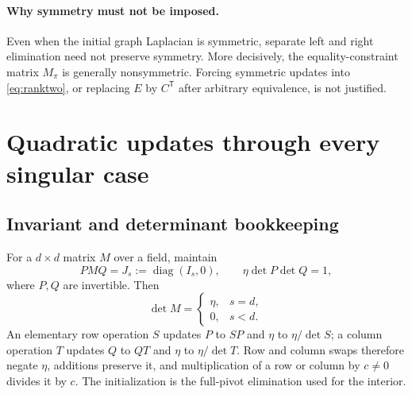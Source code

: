 \documentclass[11pt,letterpaper]{article}
\theoremstyle{definition}\newtheorem{definition}[theorem]{Definition}
\theoremstyle{remark}\newtheorem{remark}[theorem]{Remark}
\newcommand{\diag}{\operatorname{diag}}
\newcommand{\trans}{^{\mathsf T}}
\begin{document}
\paragraph{Why symmetry must not be imposed.}
Even when the initial graph Laplacian is symmetric, separate left and right elimination need not preserve symmetry. More decisively, the equality-constraint matrix $M_\pi$ is generally nonsymmetric. Forcing symmetric updates into \eqref{eq:ranktwo}, or replacing $E$ by $C\trans$ after arbitrary equivalence, is not justified.

\section{Quadratic updates through every singular case}
\label{sec:rank}

\subsection{Invariant and determinant bookkeeping}
For a $d\times d$ matrix $M$ over a field, maintain
\begin{equation}
 PMQ=J_s:=\diag(I_s,0),\qquad
 \eta\det P\det Q=1,
 \label{eq:normal}
\end{equation}
where $P,Q$ are invertible. Then
\begin{equation}
 \det M=\begin{cases}\eta,&s=d,\\0,&s<d.\end{cases}
 \label{eq:detread}
\end{equation}
An elementary row operation $S$ updates $P$ to $SP$ and $\eta$ to $\eta/\det S$; a column operation $T$ updates $Q$ to $QT$ and $\eta$ to $\eta/\det T$. Row and column swaps therefore negate $\eta$, additions preserve it, and multiplication of a row or column by $c\neq0$ divides it by $c$. The initialization is the full-pivot elimination used for the interior.
\end{document}
